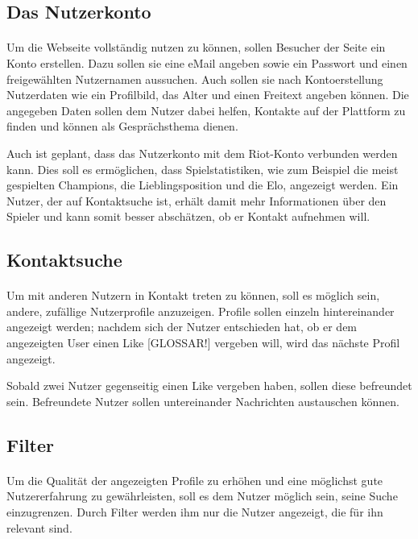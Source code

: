 \subsection{Das Nutzerkonto}
\paragraph{}
Um die Webseite vollständig nutzen zu können, sollen Besucher der Seite ein Konto erstellen. Dazu sollen sie eine eMail angeben sowie ein Passwort und einen freigewählten Nutzernamen aussuchen. Auch sollen sie nach Kontoerstellung Nutzerdaten wie ein Profilbild, das Alter und einen Freitext angeben können. Die angegeben Daten sollen dem Nutzer dabei helfen, Kontakte auf der Plattform zu finden und können als Gesprächsthema dienen.

Auch ist geplant, dass das Nutzerkonto mit dem Riot-Konto verbunden werden kann. Dies soll es ermöglichen, dass Spielstatistiken, wie zum Beispiel die meist gespielten Champions, die Lieblingsposition und die Elo, angezeigt werden. Ein Nutzer, der auf Kontaktsuche ist, erhält damit mehr Informationen über den Spieler und kann somit besser abschätzen, ob er Kontakt aufnehmen will. 

\subsection{Kontaktsuche}
\paragraph{}
Um mit anderen Nutzern in Kontakt treten zu können, soll es möglich sein, andere, zufällige Nutzerprofile anzuzeigen. Profile sollen einzeln hintereinander angezeigt werden; nachdem sich der Nutzer entschieden hat, ob er dem angezeigten User einen Like [GLOSSAR!] vergeben will, wird das nächste Profil angezeigt.

Sobald zwei Nutzer gegenseitig einen Like vergeben haben, sollen diese befreundet sein. Befreundete Nutzer sollen untereinander Nachrichten austauschen können.

\subsection{Filter}
\paragraph{}
Um die Qualität der angezeigten Profile zu erhöhen und eine möglichst gute Nutzererfahrung zu gewährleisten, soll es dem Nutzer möglich sein, seine Suche einzugrenzen. Durch Filter werden ihm nur die Nutzer angezeigt, die für ihn relevant sind.

